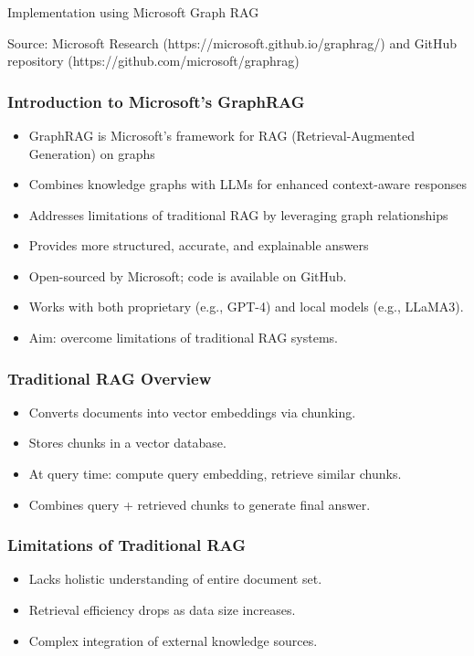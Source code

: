 \begin{frame}[fragile]\frametitle{}
\begin{center}
{\Large Implementation using Microsoft Graph RAG}

{\footnotesize Source: Microsoft Research (https://microsoft.github.io/graphrag/) and GitHub repository (https://github.com/microsoft/graphrag)}
\end{center}
\end{frame}


\begin{frame}[fragile]\frametitle{Introduction to Microsoft's GraphRAG}
	\begin{itemize}
	\item GraphRAG is Microsoft's framework for RAG (Retrieval-Augmented Generation) on graphs
	\item Combines knowledge graphs with LLMs for enhanced context-aware responses
	\item Addresses limitations of traditional RAG by leveraging graph relationships
	\item Provides more structured, accurate, and explainable answers
    \item Open-sourced by Microsoft; code is available on GitHub.
    \item Works with both proprietary (e.g., GPT-4) and local models (e.g., LLaMA3).
    \item Aim: overcome limitations of traditional RAG systems.	
	\end{itemize}
\end{frame}

\begin{frame}[fragile]\frametitle{Traditional RAG Overview}
  \begin{itemize}
    \item Converts documents into vector embeddings via chunking.
    \item Stores chunks in a vector database.
    \item At query time: compute query embedding, retrieve similar chunks.
    \item Combines query + retrieved chunks to generate final answer.
  \end{itemize}
\end{frame}

\begin{frame}[fragile]\frametitle{Limitations of Traditional RAG}
  \begin{itemize}
    \item Lacks holistic understanding of entire document set.
    \item Retrieval efficiency drops as data size increases.
    \item Complex integration of external knowledge sources.
  \end{itemize}
\end{frame}

